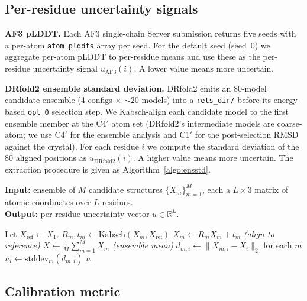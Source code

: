 \documentclass[conference,10pt]{IEEEtran}
\begin{document}
\subsection{Per-residue uncertainty signals}

\textbf{AF3 pLDDT.} Each AF3 single-chain Server submission returns
five seeds with a per-atom \texttt{atom\_plddts} array per seed.
For the default seed (seed~0) we aggregate per-atom pLDDT to
per-residue means and use these as the per-residue uncertainty
signal $u_{\text{AF3}}(i)$. A lower value means more uncertain.

\textbf{DRfold2 ensemble standard deviation.} DRfold2 emits an
$80$-model candidate ensemble (4 configs $\times$ $\sim 20$ models)
into a \texttt{rets\_dir/} before its energy-based \texttt{opt\_0}
selection step. We Kabsch-align each candidate model to the first
ensemble member at the C4$'$ atom set (DRfold2's intermediate models
are coarse-atom; we use C4$'$ for the ensemble analysis and C1$'$
for the post-selection RMSD against the crystal). For each residue
$i$ we compute the standard deviation of the $80$ aligned positions
as $u_{\text{DRfold2}}(i)$. A higher value means more uncertain. The
extraction procedure is given as Algorithm~\ref{algo:ensstd}.

\begin{algorithm}[!t]
\caption{Per-residue uncertainty from an unprocessed ensemble.}
\label{algo:ensstd}
\textbf{Input:} ensemble of $M$ candidate structures $\{X_m\}_{m=1}^{M}$,
each a $L \times 3$ matrix of atomic coordinates over $L$ residues.\\
\textbf{Output:} per-residue uncertainty vector $u \in \mathbb{R}^L$.
\begin{algorithmic}[1]
  \STATE Let $X_{\text{ref}} \gets X_1$.
    \STATE $R_m, t_m \gets \mathrm{Kabsch}(X_m, X_{\text{ref}})$
    \STATE $X_m \gets R_m X_m + t_m$  \quad \emph{(align to reference)}
  \ENDFOR
  \STATE $\bar{X} \gets \frac{1}{M} \sum_{m=1}^{M} X_m$ \quad \emph{(ensemble mean)}
    \STATE $d_{m,i} \gets \| X_{m,i} - \bar{X}_i \|_2$ for each $m$
    \STATE $u_i \gets \mathrm{stddev}_m(d_{m,i})$
  \ENDFOR
  \RETURN $u$
\end{algorithmic}
\end{algorithm}

\subsection{Calibration metric}
\end{document}
